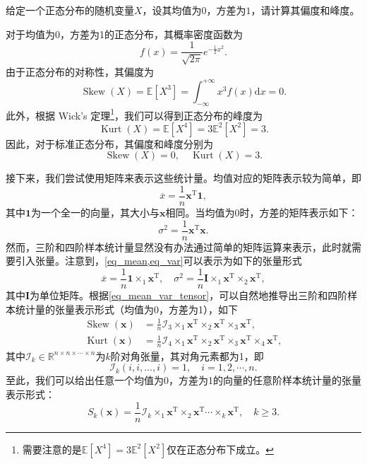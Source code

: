 \begin{example}
    给定一个正态分布的随机变量\( X \)，设其均值为\( 0 \)，方差为\( 1 \)，请计算其偏度和峰度。
\end{example}
\begin{solution}
    对于均值为0，方差为1的正态分布，其概率密度函数为
    \[
        f(x) = \frac{1}{\sqrt{2\pi}} e^{-\frac{1}{2}x^2}.
    \]
    由于正态分布的对称性，其偏度为
    \[
        \operatorname{Skew}(X) = \mathbb{E}\left[X^3\right] = \int_{-\infty}^{+\infty} x^3 f(x) \mathrm{d}x = 0.
    \]
    此外，根据 Wick's 定理\footnote{需要注意的是\( \mathbb{E}\left[X^4\right] = 3 \mathbb{E}^2\left[ X^2 \right] \)仅在正态分布下成立。}，我们可以得到正态分布的峰度为
    \[
        \operatorname{Kurt}(X) = \mathbb{E}\left[X^4\right] = 3 \mathbb{E}^2\left[ X^2 \right] = 3.
    \]
    因此，对于标准正态分布，其偏度和峰度分别为
    \[
        \operatorname{Skew}(X) = 0, \quad \operatorname{Kurt}(X) = 3.
    \]
\end{solution}

接下来，我们尝试使用矩阵来表示这些统计量。均值对应的矩阵表示较为简单，即
\begin{equation} \label{eq_mean}
    \overline{x} = \frac{1}{n} \bm{x}^{\mathrm{T}} \bm{1},
\end{equation}
其中\( \bm{1} \)为一个全一的向量，其大小与\( \bm{x} \)相同。当均值为0时，方差的矩阵表示如下：
\begin{equation} \label{eq_var}
    \sigma^2 = \frac{1}{n} \bm{x}^{\mathrm{T}} \bm{x}.
\end{equation}
然而，三阶和四阶样本统计量显然没有办法通过简单的矩阵运算来表示，此时就需要引入张量。注意到，\cref{eq_mean,eq_var}可以表示为如下的张量形式
\begin{equation} \label{eq_mean_var_tensor}
    \overline{x} = \frac{1}{n} \bm{1} \times_1 \bm{x}^{\mathrm{T}}, \quad \sigma^2 = \frac{1}{n} \mathbf{I} \times_1 \bm{x}^{\mathrm{T}} \times_2 \bm{x}^{\mathrm{T}},
\end{equation}
其中\( \mathbf{I} \)为单位矩阵。根据\cref{eq_mean_var_tensor}，可以自然地推导出三阶和四阶样本统计量的张量表示形式（均值为0，方差为1），如下
\begin{equation}
    \begin{split}
        \operatorname{Skew}(\bm{x}) & = \frac{1}{n} \mathcal{I}_3 \times_1 \bm{x}^{\mathrm{T}} \times_2 \bm{x}^{\mathrm{T}} \times_3 \bm{x}^{\mathrm{T}},                              \\
        \operatorname{Kurt}(\bm{x}) & = \frac{1}{n} \mathcal{I}_4 \times_1 \bm{x}^{\mathrm{T}} \times_2 \bm{x}^{\mathrm{T}} \times_3 \bm{x}^{\mathrm{T}} \times_4 \bm{x}^{\mathrm{T}},
    \end{split}
\end{equation}
其中\( \mathcal{I}_k \in \mathbb{R}^{n \times n \times \cdots \times n} \)为\( k \)阶对角张量，其对角元素都为1，即
\[
    \mathcal{I}_k(i, i, \ldots, i) = 1,\quad i = 1, 2, \cdots, n.
\]
至此，我们可以给出任意一个均值为0，方差为1的向量的任意阶样本统计量的张量表示形式：
\begin{equation}
    S_k(\bm{x}) = \frac{1}{n} \mathcal{I}_k \times_1 \bm{x}^{\mathrm{T}} \times_2 \bm{x}^{\mathrm{T}} \cdots \times_k \bm{x}^{\mathrm{T}}, \quad k \geq 3.
\end{equation}


